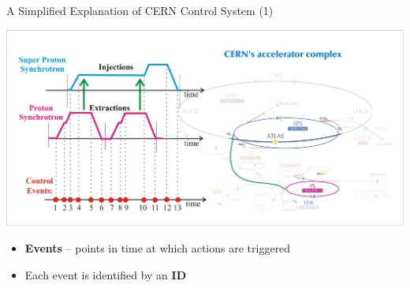 \documentclass[compress,red]{beamer}
\begin{document}
\begin{frame}{A Simplified Explanation of CERN Control System (1)}

      \begin{center}
      \includegraphics[width=1.0\textwidth]{applications/CERN/event1.pdf}
      \end{center}

  \begin{itemize}
    \item {\bf Events} -- points in time at which actions are triggered
    \item Each event is identified by an {\bf ID}
  \end{itemize}

\end{frame}
\end{document}
